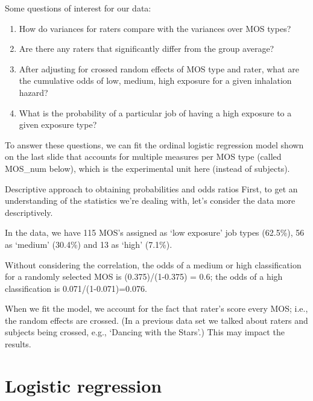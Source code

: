\documentclass[
  9pt,
  ignorenonframetext,
]{beamer}
\begin{document}
\begin{frame}{Some questions of interest for our data:}
\protect\hypertarget{some-questions-of-interest-for-our-data}{}
\begin{enumerate}
\item
  How do variances for raters compare with the variances over MOS types?
\item
  Are there any raters that significantly differ from the group average?
\item
  After adjusting for crossed random effects of MOS type and rater, what
  are the cumulative odds of low, medium, high exposure for a given
  inhalation hazard?
\item
  What is the probability of a particular job of having a high exposure
  to a given exposure type?
\end{enumerate}

To answer these questions, we can fit the ordinal logistic regression
model shown on the last slide that accounts for multiple measures per
MOS type (called MOS\_num below), which is the experimental unit here
(instead of subjects).
\end{frame}

\begin{frame}{Descriptive approach to obtaining probabilities and odds
ratios}
\protect\hypertarget{descriptive-approach-to-obtaining-probabilities-and-odds-ratios}{}
First, to get an understanding of the statistics we're dealing with,
let's consider the data more descriptively.

In the data, we have 115 MOS's assigned as `low exposure' job types
(62.5\%), 56 as `medium' (30.4\%) and 13 as `high' (7.1\%).

Without considering the correlation, the odds of a medium or high
classification for a randomly selected MOS is (0.375)/(1-0.375) = 0.6;
the odds of a high classification is 0.071/(1-0.071)=0.076.

When we fit the model, we account for the fact that rater's score every
MOS; i.e., the random effects are crossed. (In a previous data set we
talked about raters and subjects being crossed, e.g., `Dancing with the
Stars'.) This may impact the results.
\end{frame}

\hypertarget{logistic-regression}{%
\section{Logistic regression}\label{logistic-regression}}
\end{document}
